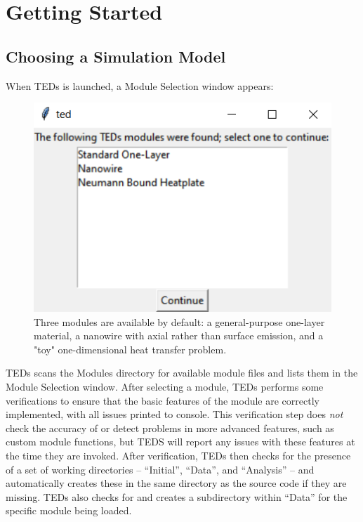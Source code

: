 \documentclass[11pt,letterpaper,titlepage]{article}
\begin{document}
	\newpage
	\section{Getting Started}
		\subsection{Choosing a Simulation Model}
		\par
		When TEDs is launched, a Module Selection window appears:
		\begin{figure}[H]
			\label{fig:mod_select}
			\centering
			\includegraphics[scale=1]{"mod_select"}
			\caption{Three modules are available by default: a general-purpose one-layer material, a nanowire with axial rather than surface emission, and a "toy" one-dimensional heat transfer problem.}
		\end{figure}
	
		\par
		TEDs scans the Modules directory for available module files and lists them in the Module Selection window. After selecting a module, TEDs performs some verifications to ensure that the basic features of the module are correctly implemented, with all issues printed to console. This verification step does \textit{not} check the accuracy of or detect problems in more advanced features, such as custom module functions, but TEDS will report any issues with these features at the time they are invoked. After verification, TEDs then checks for the presence of a set of working directories – “Initial”, “Data”, and “Analysis” – and automatically creates these in the same directory as the source code if they are missing. TEDs also checks for and creates a subdirectory within “Data” for the specific module being loaded.
	
\end{document}
